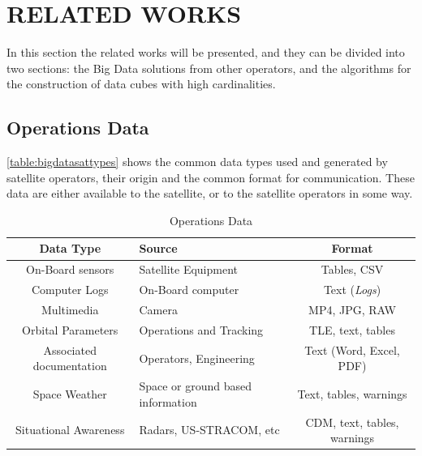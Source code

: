 
\chapter{RELATED WORKS}\label{ch:corr}

In this section the related works will be presented, and they can be divided into two sections: the Big Data solutions from other operators, and the algorithms for the construction of data cubes with high cardinalities.

\section{Operations Data}\label{ch:corr:data}

\autoref{table:bigdatasattypes} shows the common data types used and generated by satellite operators, their origin and the common format for communication.
These data are either available to the satellite, or to the satellite operators in some way.

\begin{table}[!ht]
  \begin{center}
    \caption{Operations Data}\label{table:bigdatasattypes}
    \begin{tabular}{|c|C{5cm}|c|}
      \hline
      \bfseries Data Type & \bfseries Source           & \bfseries Format      \\
      \hline
      On-Board sensors & Satellite Equipment & Tables, CSV           \\
      \hline
      Computer Logs & On-Board computer& Text (\textit{Logs})  \\
      \hline
      Multimedia                     & Camera                    & MP4, JPG, RAW          \\
      \hline
      Orbital Parameters & Operations and Tracking & TLE, text, tables    \\
      \hline
      Associated documentation & Operators, Engineering  & Text (Word, Excel, PDF)    \\
      \hline
      Space Weather & Space or ground based information & Text, tables, warnings \\
      \hline
      Situational Awareness & Radars, US-STRACOM, etc   & CDM, text, tables, warnings \\
      \hline
    \end{tabular}
  \end{center}
\end{table}

